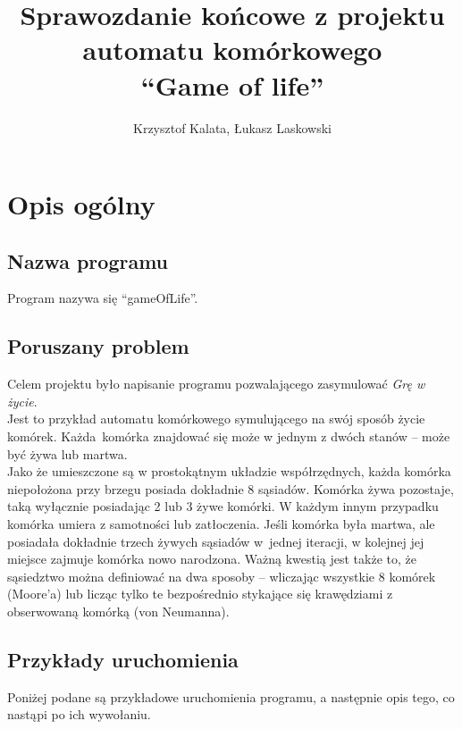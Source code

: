\documentclass{article}
\title{Sprawozdanie końcowe z projektu\\automatu komórkowego\\``Game of life''}
\author{Krzysztof Kalata, Łukasz Laskowski}
\begin{document}
\maketitle
\newpage

\tableofcontents
\newpage

\section{Opis ogólny}
\subsection{Nazwa programu}
Program nazywa się ``gameOfLife''.

\subsection{Poruszany problem}
Celem projektu było napisanie programu pozwalającego zasymulować \textit{Grę w
życie}. \\Jest to przykład automatu komórkowego symulującego na swój sposób
życie komórek. Każda~komórka znajdować się może w jednym z dwóch stanów --
może być żywa lub martwa. \\Jako że umieszczone są w prostokątnym układzie
współrzędnych, każda komórka niepołożona przy brzegu posiada dokładnie 8
sąsiadów. Komórka żywa pozostaje, taką wyłącznie posiadając 2 lub 3 żywe komórki.
W każdym innym przypadku komórka umiera z samotności lub zatłoczenia. Jeśli
komórka była martwa, ale posiadała dokładnie trzech żywych sąsiadów w~jednej iteracji,
w kolejnej jej miejsce zajmuje komórka nowo narodzona. Ważną
kwestią jest także to, że sąsiedztwo można definiować na dwa sposoby – wliczając
wszystkie 8 komórek (Moore’a) lub licząc tylko te bezpośrednio stykające się
krawędziami z obserwowaną komórką (von Neumanna).


\subsection{Przykłady uruchomienia}
Poniżej podane są przykładowe uruchomienia programu, a następnie opis
tego, co nastąpi po ich wywołaniu.
\end{document}
